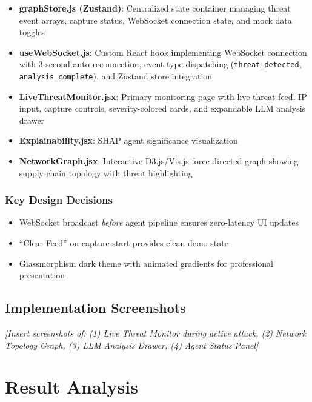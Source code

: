 \documentclass[12pt, a4paper]{report}
\begin{document}
\begin{itemize}
    \item \textbf{graphStore.js (Zustand)}: Centralized state container managing threat event arrays, capture status, WebSocket connection state, and mock data toggles
    \item \textbf{useWebSocket.js}: Custom React hook implementing WebSocket connection with 3-second auto-reconnection, event type dispatching (\texttt{threat\_detected}, \texttt{analysis\_complete}), and Zustand store integration
    \item \textbf{LiveThreatMonitor.jsx}: Primary monitoring page with live threat feed, IP input, capture controls, severity-colored cards, and expandable LLM analysis drawer
    \item \textbf{Explainability.jsx}: SHAP agent significance visualization
    \item \textbf{NetworkGraph.jsx}: Interactive D3.js/Vis.js force-directed graph showing supply chain topology with threat highlighting
\end{itemize}

\subsection{Key Design Decisions}
\begin{itemize}
    \item WebSocket broadcast \textit{before} agent pipeline ensures zero-latency UI updates
    \item ``Clear Feed'' on capture start provides clean demo state
    \item Glassmorphism dark theme with animated gradients for professional presentation
\end{itemize}

\section{Implementation Screenshots}

\textit{[Insert screenshots of: (1) Live Threat Monitor during active attack, (2) Network Topology Graph, (3) LLM Analysis Drawer, (4) Agent Status Panel]}


\chapter{Result Analysis}
\end{document}
